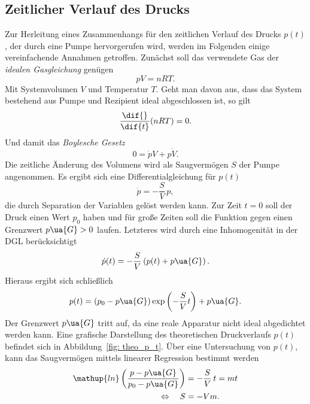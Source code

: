 \subsection{Zeitlicher Verlauf des Drucks}
Zur Herleitung eines Zusammenhangs für den zeitlichen Verlauf des Drucks $p(t)$, der durch eine Pumpe
hervorgerufen wird, werden im Folgenden einige vereinfachende Annahmen getroffen. Zunächst soll das
verwendete Gas der \emph{idealen Gasgleichung} genügen
\begin{equation}
  p V = n R T.
  \label{eq: ideale_gasgleichung}
\end{equation}
Mit Systemvolumen $V$ und Temperatur $T$. Geht man davon aus, dass das System bestehend aus
Pumpe und Rezipient ideal abgeschlossen ist, so gilt
\begin{equation}
  \frac{\dif{}}{\dif{t}}(n R T ) = 0.
\end{equation}
Und damit das \emph{Boylesche Gesetz}
\begin{equation}
  0 = \dot{p}V  + p\dot{V}.
\end{equation}
Die zeitliche Änderung des Volumens wird als Saugvermögen $S$ der Pumpe angenommen. Es ergibt sich eine Differentialgleichung für $p(t)$
\begin{equation}
  \dot{p} = - \frac{S}{V}\, p,
\end{equation}
die durch Separation der Variablen gelöst werden kann. Zur Zeit $t = 0$ soll der Druck einen Wert $p_0$ haben und für große
Zeiten soll die Funktion gegen einen Grenzwert $p\ua{G} > 0$ laufen. Letzteres wird durch eine Inhomogenität in der DGL berücksichtigt
\begin{equation}
  \dot{p}(t) = - \frac{S}{V} \left(p(t) + p\ua{G}\right).
\end{equation}
Hieraus ergibt sich schließlich
\begin{equation}
  p(t) = (p_0 - p\ua{G})\exp\left(- \frac{S}{V} t \right) + p\ua{G}.
  \label{eq: evakuierungskurve}
\end{equation}
Der Grenzwert $p\ua{G}$ tritt auf, da eine reale Apparatur nicht ideal abgedichtet werden kann.
Eine grafische Darstellung des theoretischen Druckverlaufs $p(t)$ befindet sich in Abbildung~\ref{fig: theo_p_t}.
Über eine Untersuchung von $p(t)$, kann das Saugvermögen mittels
linearer Regression bestimmt werden
\begin{align}
  \begin{aligned}
  \mathup{ln}\left(\frac{p - p\ua{G}}{p_0 - p\ua{G}}\right) &= - \frac{S}{V}\,t = m t \\
  \Leftrightarrow \quad S &= -V m.
  \label{eq: saugvermögen_druckverlauf}
\end{aligned}
\end{align}
